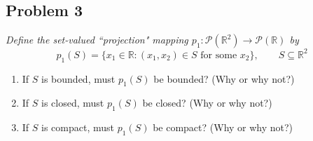\documentclass{article}
\newcommand{\R}{{\mathbb R}}
\begin{document}
\subsection*{Problem 3}
{\it Define the set-valued ``projection" mapping
$p_1 \colon \mathcal{P}(\R^2) \to \mathcal{P}(\R)$ by
\[
	p_1(S) = \{x_1 \in \R \colon (x_1,x_2) \in S \text{ for some }x_2\},
	\qquad S \subseteq \R^2
\]
\begin{enumerate}
	\item If $S$ is bounded, must $p_1(S)$ be bounded? (Why or why not?)
	\item If $S$ is closed, must $p_1(S)$ be closed? (Why or why not?)
	\item If $S$ is compact, must $p_1(S)$ be compact? (Why or why not?)
\end{enumerate}}
\end{document}
